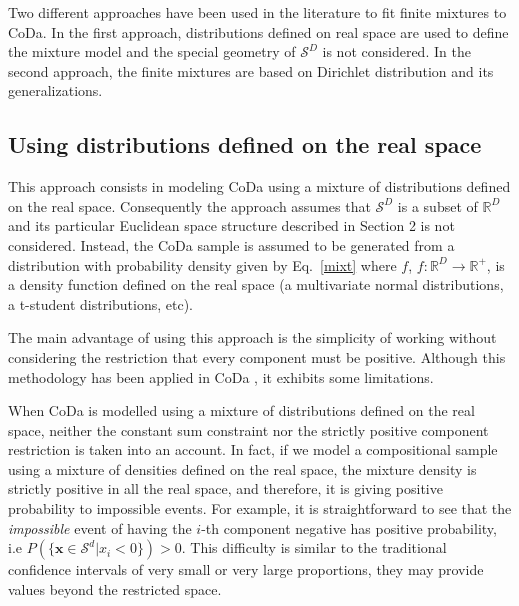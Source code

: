 \documentclass[10pt, a4paper]{article}
\begin{document}
\noindent Two different approaches have been used in the literature to fit finite mixtures to CoDa. 
In the first approach,  distributions defined on real space are used to define the mixture model and the special geometry of $\mathcal{S}^D$ is not considered. In the second approach,  the finite mixtures are based on Dirichlet distribution and its generalizations.


\subsection{Using distributions defined on the real space}
\label{real_section}

This approach consists in modeling CoDa using a mixture of distributions defined on the real space. Consequently the approach assumes that $\mathcal{S}^D$ is a subset of $\mathbb{R}^D$ and its particular Euclidean space structure described in Section 2 is not considered. Instead, the CoDa sample is assumed to be generated from a distribution with probability density given by Eq.~\ref{mixt} where $f$, $f: \mathbb{R}^D \rightarrow \mathbb{R}^+$, is a density function defined on the real space (a multivariate normal distributions, a  t-student distributions, etc).

The main advantage of using this approach is the simplicity of working without considering the restriction that every component must be positive.
Although this methodology has been applied in CoDa \citep[see][]{papageorgiou2001model}, it exhibits some limitations.


When CoDa is modelled using a mixture of distributions defined on the real space, neither the constant sum constraint nor the strictly positive component restriction is taken into an account. In fact, if we model a compositional sample using a mixture of densities defined on the real space, the mixture density is strictly positive in all the real space, and therefore, it is giving positive probability to impossible events. For example, it is straightforward to see that the \emph{impossible} event  of having the $i$-th component negative has positive probability, i.e $P(\{ \textbf{x} \in \mathcal{S}^d | x_i < 0 \}) > 0$. This difficulty is similar to the traditional confidence intervals of very small or very large proportions, they may provide values beyond the restricted space. 
\end{document}
